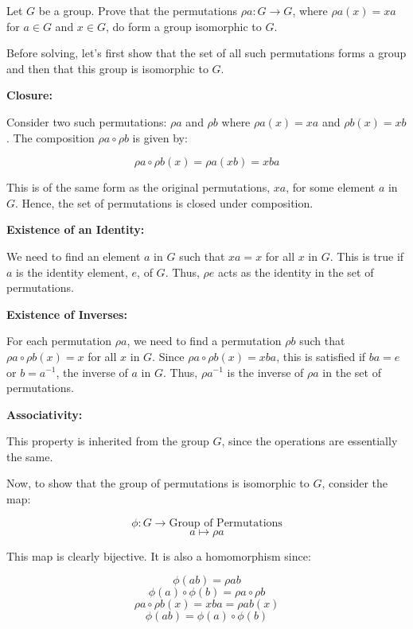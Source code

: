 \documentclass[12pt]{amsart}
\theoremstyle{definition}
\numberwithin{equation}{section}
\theoremstyle{plain}
\begin{document}
\vspace*{20pt}
\begin{exercise}{52} Let $G$ be a group. Prove that the permutations $\rho a : G \rightarrow G$, where $\rho a(x) = xa$ for $a \in G$ and $x \in G$, do form
    a group isomorphic to $G$.


    Before solving, let's first show that the set of all such permutations forms a group and then that this group is isomorphic to \( G \).

    \textbf{Closure:}
    
    Consider two such permutations: \( \rho a \) and \( \rho b \) where \( \rho a(x) = xa \) and \( \rho b(x) = xb \). The composition \( \rho a \circ \rho b \) is given by:
    
    \[ \rho a \circ \rho b (x) = \rho a(xb) = xba \]
    
    This is of the same form as the original permutations, \( xa \), for some element \( a \) in \( G \). Hence, the set of permutations is closed under composition.
    
    \textbf{Existence of an Identity:}
    
    We need to find an element \( a \) in \( G \) such that \( xa = x \) for all \( x \) in \( G \). This is true if \( a \) is the identity element, \( e \), of \( G \). Thus, \( \rho e \) acts as the identity in the set of permutations.
    
    \textbf{Existence of Inverses:}
    
    For each permutation \( \rho a \), we need to find a permutation \( \rho b \) such that \( \rho a \circ \rho b (x) = x \) for all \( x \) in \( G \). Since \( \rho a \circ \rho b (x) = xba \), this is satisfied if \( ba = e \) or \( b = a^{-1} \), the inverse of \( a \) in \( G \). Thus, \( \rho a^{-1} \) is the inverse of \( \rho a \) in the set of permutations.
    
    \textbf{Associativity:}
    
    This property is inherited from the group \( G \), since the operations are essentially the same.
    
    Now, to show that the group of permutations is isomorphic to \( G \), consider the map:
    
    \[ \phi: G \rightarrow \text{Group of Permutations} \]
    \[ a \mapsto \rho a \]
    
    This map is clearly bijective. It is also a homomorphism since:
    
    \[ \phi(ab) = \rho ab \]
    \[ \phi(a) \circ \phi(b) = \rho a \circ \rho b \]
    \[ \rho a \circ \rho b (x) = xba = \rho ab(x) \]
    \[ \phi(ab) = \phi(a) \circ \phi(b) \]
    

\end{exercise}
\end{document}
